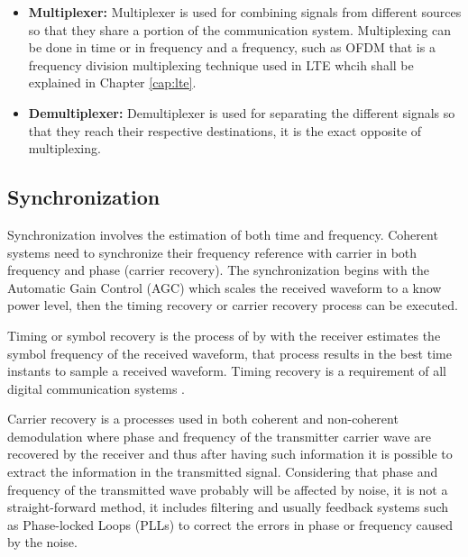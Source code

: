 \begin{itemize}

  \item \textbf{Multiplexer:} Multiplexer is used for combining signals from
  different sources so that they share a portion of the communication system.
  Multiplexing can be done in time or in frequency and a frequency, such as OFDM
  that is a frequency division multiplexing technique used in LTE whcih shall be
  explained in Chapter \ref{cap:lte}.

  \item \textbf{Demultiplexer:} Demultiplexer is used for separating the
  different signals so that they reach their respective destinations, it is the
  exact opposite of multiplexing.

\end{itemize}

\subsection{Synchronization}

Synchronization involves the estimation of both time and frequency. Coherent
systems need to synchronize their frequency reference with carrier in both
frequency and phase (carrier recovery). The synchronization begins with the
Automatic Gain Control (AGC) which scales the received waveform to a know power
level, then the timing recovery or carrier recovery process can be executed.

Timing or symbol recovery is the process of by with the receiver estimates the
symbol frequency of the received waveform, that process results in the best time
instants to sample a received waveform. Timing recovery is a requirement of all
digital communication systems \cite{akbook}.

Carrier recovery is a processes used in both coherent and non-coherent
demodulation where phase and frequency of the transmitter carrier wave are
recovered by the receiver and thus after having such information it is possible
to extract the information in the transmitted signal. Considering that phase and
frequency of the transmitted wave probably will be affected by noise, it is not
a straight-forward method, it includes filtering and usually feedback systems
such as Phase-locked Loops (PLLs) to correct the errors in phase or frequency
caused by the noise.
